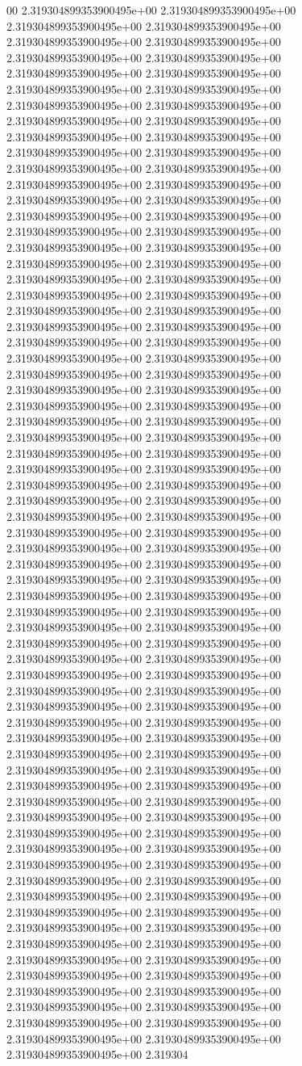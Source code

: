 00	2.319304899353900495e+00	2.319304899353900495e+00	2.319304899353900495e+00	2.319304899353900495e+00	2.319304899353900495e+00	2.319304899353900495e+00	2.319304899353900495e+00	2.319304899353900495e+00	2.319304899353900495e+00	2.319304899353900495e+00	2.319304899353900495e+00	2.319304899353900495e+00	2.319304899353900495e+00	2.319304899353900495e+00	2.319304899353900495e+00	2.319304899353900495e+00	2.319304899353900495e+00	2.319304899353900495e+00	2.319304899353900495e+00	2.319304899353900495e+00	2.319304899353900495e+00	2.319304899353900495e+00	2.319304899353900495e+00	2.319304899353900495e+00	2.319304899353900495e+00	2.319304899353900495e+00	2.319304899353900495e+00	2.319304899353900495e+00	2.319304899353900495e+00	2.319304899353900495e+00	2.319304899353900495e+00	2.319304899353900495e+00	2.319304899353900495e+00	2.319304899353900495e+00	2.319304899353900495e+00	2.319304899353900495e+00	2.319304899353900495e+00	2.319304899353900495e+00	2.319304899353900495e+00	2.319304899353900495e+00	2.319304899353900495e+00	2.319304899353900495e+00	2.319304899353900495e+00	2.319304899353900495e+00	2.319304899353900495e+00	2.319304899353900495e+00	2.319304899353900495e+00	2.319304899353900495e+00	2.319304899353900495e+00	2.319304899353900495e+00	2.319304899353900495e+00	2.319304899353900495e+00	2.319304899353900495e+00	2.319304899353900495e+00	2.319304899353900495e+00	2.319304899353900495e+00	2.319304899353900495e+00	2.319304899353900495e+00	2.319304899353900495e+00	2.319304899353900495e+00	2.319304899353900495e+00	2.319304899353900495e+00	2.319304899353900495e+00	2.319304899353900495e+00	2.319304899353900495e+00	2.319304899353900495e+00	2.319304899353900495e+00	2.319304899353900495e+00	2.319304899353900495e+00	2.319304899353900495e+00	2.319304899353900495e+00	2.319304899353900495e+00	2.319304899353900495e+00	2.319304899353900495e+00	2.319304899353900495e+00	2.319304899353900495e+00	2.319304899353900495e+00	2.319304899353900495e+00	2.319304899353900495e+00	2.319304899353900495e+00	2.319304899353900495e+00	2.319304899353900495e+00	2.319304899353900495e+00	2.319304899353900495e+00	2.319304899353900495e+00	2.319304899353900495e+00	2.319304899353900495e+00	2.319304899353900495e+00	2.319304899353900495e+00	2.319304899353900495e+00	2.319304899353900495e+00	2.319304899353900495e+00	2.319304899353900495e+00	2.319304899353900495e+00	2.319304899353900495e+00	2.319304899353900495e+00	2.319304899353900495e+00	2.319304899353900495e+00	2.319304899353900495e+00	2.319304899353900495e+00	2.319304899353900495e+00	2.319304899353900495e+00	2.319304899353900495e+00	2.319304899353900495e+00	2.319304899353900495e+00	2.319304899353900495e+00	2.319304899353900495e+00	2.319304899353900495e+00	2.319304899353900495e+00	2.319304899353900495e+00	2.319304899353900495e+00	2.319304899353900495e+00	2.319304899353900495e+00	2.319304899353900495e+00	2.319304899353900495e+00	2.319304899353900495e+00	2.319304899353900495e+00	2.319304899353900495e+00	2.319304899353900495e+00	2.319304899353900495e+00	2.319304899353900495e+00	2.319304899353900495e+00	2.319304899353900495e+00	2.319304899353900495e+00	2.319304899353900495e+00	2.319304899353900495e+00	2.319304899353900495e+00	2.319304899353900495e+00	2.319304899353900495e+00	2.319304899353900495e+00	2.319304899353900495e+00	2.319304899353900495e+00	2.319304899353900495e+00	2.319304